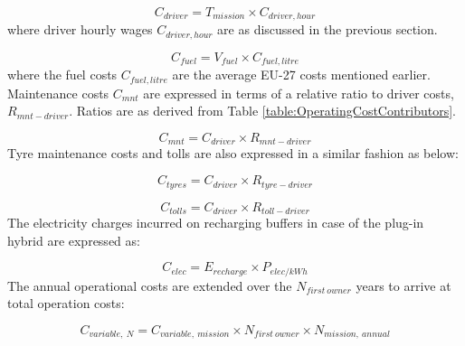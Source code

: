 \documentclass[ExampleMasters.tex]{subfiles}
\begin{document}
			\begin{equation}
				C_{driver} = T_{mission} \times C_{driver, hour}
			\end{equation}
			where driver hourly wages $C_{driver, hour}$ are as discussed in the previous section.

			\begin{equation}
				C_{fuel} = V_{fuel} \times C_{fuel, litre}
			\end{equation}
			where the fuel costs $C_{fuel, litre}$ are the average EU-27 costs mentioned earlier. Maintenance costs $C_{mnt}$ are expressed in terms of a relative ratio to driver costs, $R_{mnt-driver}$. Ratios are as derived from Table \ref{table:OperatingCostContributors}.         

			\begin{equation}
				C_{mnt} = C_{driver} \times R_{mnt-driver}
			\end{equation}
			Tyre maintenance costs and tolls are also expressed in a similar fashion as below:

			\begin{equation}
				C_{tyres} = C_{driver} \times R_{tyre-driver}
			\end{equation}

			\begin{equation}
				C_{tolls} = C_{driver} \times R_{toll-driver}
			\end{equation}
			The electricity charges incurred on recharging buffers in case of the plug-in hybrid are expressed as:

			\begin{equation}
				C_{elec} = E_{recharge} \times P_{elec/kWh}
			\end{equation}
			The annual operational costs are extended over the $N_{first\ owner}$ years to arrive at total operation costs:

			\begin{equation}
				C_{variable,\ N} = C_{variable,\ mission} \times N_{first\ owner} \times N_{mission,\ annual}
			\end{equation}
\end{document}
